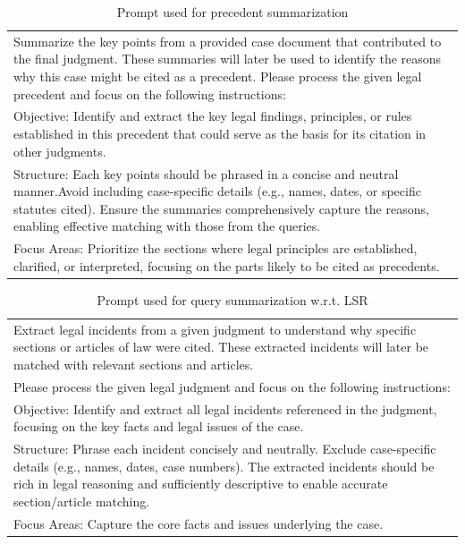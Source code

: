 \begin{table}
    \centering
    \begin{tabular}{|p{}|}
    \hline
    Summarize the key points from a provided case document that contributed to the final judgment. These summaries will later be used to identify the reasons why this case might be cited as a precedent. Please process the given legal precedent and focus on the following instructions:
\\
    Objective:  Identify and extract the key legal findings, principles, or rules established in this precedent that could serve as the basis for its citation in other judgments.
\\
    Structure: Each key points should be phrased in a concise and neutral manner.Avoid including case-specific details (e.g., names, dates, or specific statutes cited).
                             Ensure the summaries comprehensively capture the reasons, enabling effective matching with those from the queries.
\\
                    Focus Areas: Prioritize the sections where legal principles are established, clarified, or interpreted, 
                    focusing on the parts likely to be cited as precedents. \\ \hline
    \end{tabular}
    \caption{Prompt used for precedent summarization}
    \label{tab:prec-summ-prompt}
\end{table}

\begin{table}
    \centering
    \begin{tabular}{|p{}|}
    \hline
    Extract legal incidents from a given judgment to understand why specific sections or articles of law
                    were cited. These extracted incidents will later be matched with relevant sections and articles.
\\
                    Please process the given legal judgment and focus on the following instructions:
\\
                    Objective: Identify and extract all legal incidents referenced in the judgment, 
                    focusing on the key facts and legal issues of the case.
\\
                    Structure: Phrase each incident concisely and neutrally.
                    Exclude case-specific details (e.g., names, dates, case numbers).
                    The extracted incidents should be rich in legal reasoning and sufficiently descriptive to enable accurate section/article matching.
\\
                    Focus Areas: Capture the core facts and issues underlying the case. \\ \hline
    \end{tabular}
    \caption{Prompt used for query summarization w.r.t. LSR}
    \label{tab:qry-summ-prompt-statwise}
\end{table}

